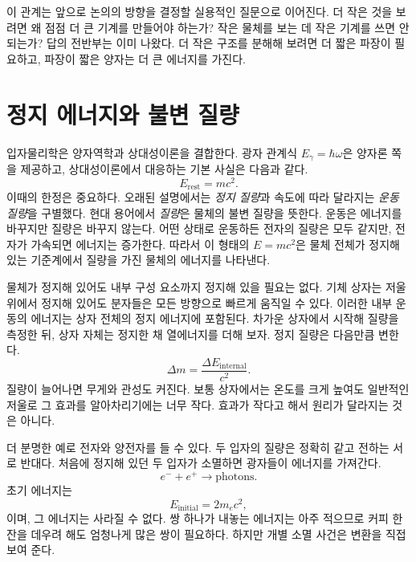 이 관계는 앞으로 논의의 방향을 결정할 실용적인 질문으로 이어진다. 더 작은 것을 보려면 왜 점점 더 큰 기계를 만들어야 하는가? 작은 물체를 보는 데 작은 기계를 쓰면 안 되는가? 답의 전반부는 이미 나왔다. 더 작은 구조를 분해해 보려면 더 짧은 파장이 필요하고, 파장이 짧은 양자는 더 큰 에너지를 가진다.

\section{정지 에너지와 불변 질량}

입자물리학은 양자역학과 상대성이론을 결합한다. 광자 관계식 \(E_\gamma=\hbar\omega\)은 양자론 쪽을 제공하고, 상대성이론에서 대응하는 기본 사실은 다음과 같다.
\begin{equation}
E_{\mathrm{rest}}=mc^2.
\end{equation}
이때의 한정은 중요하다. 오래된 설명에서는 \emph{정지 질량}과 속도에 따라 달라지는 \emph{운동 질량}을 구별했다. 현대 용어에서 \emph{질량}은 물체의 불변 질량을 뜻한다. 운동은 에너지를 바꾸지만 질량은 바꾸지 않는다. 어떤 상태로 운동하든 전자의 질량은 모두 같지만, 전자가 가속되면 에너지는 증가한다. 따라서 이 형태의 \(E=mc^2\)은 물체 전체가 정지해 있는 기준계에서 질량을 가진 물체의 에너지를 나타낸다.

물체가 정지해 있어도 내부 구성 요소까지 정지해 있을 필요는 없다. 기체 상자는 저울 위에서 정지해 있어도 분자들은 모든 방향으로 빠르게 움직일 수 있다. 이러한 내부 운동의 에너지는 상자 전체의 정지 에너지에 포함된다. 차가운 상자에서 시작해 질량을 측정한 뒤, 상자 자체는 정지한 채 열에너지를 더해 보자. 정지 질량은 다음만큼 변한다.
\begin{equation}
\Delta m=\frac{\Delta E_{\mathrm{internal}}}{c^2}.
\end{equation}
질량이 늘어나면 무게와 관성도 커진다. 보통 상자에서는 온도를 크게 높여도 일반적인 저울로 그 효과를 알아차리기에는 너무 작다. 효과가 작다고 해서 원리가 달라지는 것은 아니다.

더 분명한 예로 전자와 양전자를 들 수 있다. 두 입자의 질량은 정확히 같고 전하는 서로 반대다. 처음에 정지해 있던 두 입자가 소멸하면 광자들이 에너지를 가져간다.
\begin{equation}
e^-+e^+\longrightarrow \text{photons}.
\end{equation}
초기 에너지는
\begin{equation}
E_{\mathrm{initial}}=2m_e c^2,
\end{equation}
이며, 그 에너지는 사라질 수 없다. 쌍 하나가 내놓는 에너지는 아주 적으므로 커피 한 잔을 데우려 해도 엄청나게 많은 쌍이 필요하다. 하지만 개별 소멸 사건은 변환을 직접 보여 준다.


